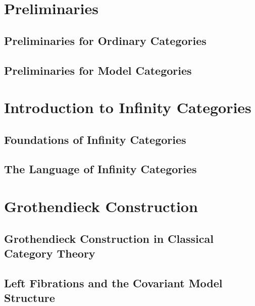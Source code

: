 \documentclass[12pt]{report}
\begin{document}


\setcounter{section}{-1}

\section{Preliminaries}

\subsection{Preliminaries for Ordinary Categories}



\subsection{Preliminaries for Model Categories}



\section{Introduction to Infinity Categories}

\subsection{Foundations of Infinity Categories}



\subsection{The Language of Infinity Categories}



\section{Grothendieck Construction}

\setcounter{subsection}{-1}

\subsection{Grothendieck Construction in Classical Category Theory}



\subsection{Left Fibrations and the Covariant Model Structure}
\end{document}

